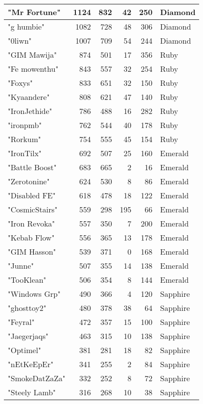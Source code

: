 \documentclass{article}
\begin{document}
\begin{table}[htbp]
\begin{tabular}{|l|r|r|r|r|l|}
"Mr Fortune" & 1124 & 832 & 42 & 250 & Diamond \\ \hline
"g humbie" & 1082 & 728 & 48 & 306 & Diamond \\ \hline
"0liwn" & 1007 & 709 & 54 & 244 & Diamond \\ \hline
"GIM Mawija" & 874 & 501 & 17 & 356 & Ruby \\ \hline
"Fe mowenthu" & 843 & 557 & 32 & 254 & Ruby \\ \hline
"Foxys" & 833 & 651 & 32 & 150 & Ruby \\ \hline
"Kyaandere" & 808 & 621 & 47 & 140 & Ruby \\ \hline
"IronJethide" & 786 & 488 & 16 & 282 & Ruby \\ \hline
"ironpmb" & 762 & 544 & 40 & 178 & Ruby \\ \hline
"Rorkum" & 754 & 555 & 45 & 154 & Ruby \\ \hline
"IronTilx" & 692 & 507 & 25 & 160 & Emerald \\ \hline
"Battle Boost" & 683 & 665 & 2 & 16 & Emerald \\ \hline
"Zerotonine" & 624 & 530 & 8 & 86 & Emerald \\ \hline
"Disabled FE" & 618 & 478 & 18 & 122 & Emerald \\ \hline
"CosmicStairs" & 559 & 298 & 195 & 66 & Emerald \\ \hline
"Iron Revoka" & 557 & 350 & 7 & 200 & Emerald \\ \hline
"Kebab Flow" & 556 & 365 & 13 & 178 & Emerald \\ \hline
"GIM Hasson" & 539 & 371 & 0 & 168 & Emerald \\ \hline
"Junne" & 507 & 355 & 14 & 138 & Emerald \\ \hline
"TooKlean" & 506 & 354 & 8 & 144 & Emerald \\ \hline
"Windows Grp" & 490 & 366 & 4 & 120 & Sapphire \\ \hline
"ghosttoy2" & 480 & 378 & 38 & 64 & Sapphire \\ \hline
"Feyral" & 472 & 357 & 15 & 100 & Sapphire \\ \hline
"Jaegerjaqs" & 463 & 315 & 10 & 138 & Sapphire \\ \hline
"Optimel" & 381 & 281 & 18 & 82 & Sapphire \\ \hline
"nEtKeEpEr" & 341 & 255 & 2 & 84 & Sapphire \\ \hline
"SmokeDatZaZa" & 332 & 252 & 8 & 72 & Sapphire \\ \hline
"Steely Lamb" & 316 & 268 & 10 & 38 & Sapphire \\ \hline

\end{tabular}
\end{table}
\end{document}
